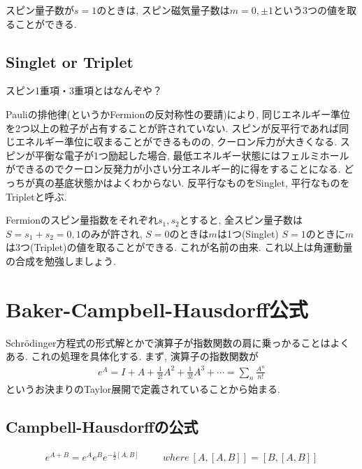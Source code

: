\documentclass[10.5pt,a4paper]{jreport}
\begin{document}
スピン量子数が$s = 1$のときは, スピン磁気量子数は$m = 0, \pm 1$という3つの値を取ることができる.
\subsection{Singlet or Triplet}
スピン1重項・3重項とはなんぞや？

Pauliの排他律(というかFermionの反対称性の要請)により, 同じエネルギー準位を2つ以上の粒子が占有することが許されていない. スピンが反平行であれば同じエネルギー準位に収まることができるものの, クーロン斥力が大きくなる. スピンが平衡な電子が1つ励起した場合, 最低エネルギー状態にはフェルミホールができるのでクーロン反発力が小さい分エネルギー的に得をすることになる. どっちが真の基底状態かはよくわからない. 反平行なものをSinglet, 平行なものをTripletと呼ぶ.

Fermionのスピン量指数をそれぞれ$s_1, s_2$とすると, 全スピン量子数は$S = s_1 + s_2 = 0, 1$のみが許され, $S = 0$のときは$m$は1つ(Singlet) $S = 1$のときに$m$は3つ(Triplet)の値を取ることができる. これが名前の由来. これ以上は角運動量の合成を勉強しましょう.
\section{Baker-Campbell-Hausdorff公式}
Schr\"odinger方程式の形式解とかで演算子が指数関数の肩に乗っかることはよくある. これの処理を具体化する. まず, 演算子の指数関数が
\begin{eqnarray}
  e^A = I + A + \frac{1}{2!}A^2 + \frac{1}{3!}A^3 + \cdots = \sum_n\frac{A^n}{n!}
\end{eqnarray}
というお決まりのTaylor展開で定義されていることから始まる. 
\subsection{Campbell-Hausdorffの公式}
\begin{screen}
  \begin{eqnarray}
    e^{A+B} = e^{A}e^{B}e^{-\frac{1}{2}[A, B]}\hspace{1cm}where\ [A, [A, B]] = [B, [A, B]]
  \end{eqnarray}
\end{screen}
\end{document}
